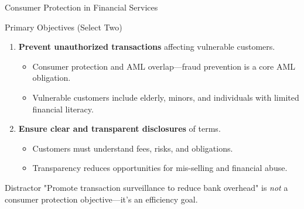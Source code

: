 \documentclass{beamer}
\begin{document}
	\begin{frame}{Consumer Protection in Financial Services}
		\begin{block}{Primary Objectives (Select Two)}
			\begin{enumerate}
				\item \textbf{Prevent unauthorized transactions} affecting vulnerable customers.
				\begin{itemize}
					\item Consumer protection and AML overlap—fraud prevention is a core AML obligation.
					\item Vulnerable customers include elderly, minors, and individuals with limited financial literacy.
				\end{itemize}
				\item \textbf{Ensure clear and transparent disclosures} of terms.
				\begin{itemize}
					\item Customers must understand fees, risks, and obligations.
					\item Transparency reduces opportunities for mis-selling and financial abuse.
				\end{itemize}
			\end{enumerate}
		\end{block}
		\begin{alertblock}{Distractor}
			"Promote transaction surveillance to reduce bank overhead" is \textit{not} a consumer protection objective—it's an efficiency goal.
		\end{alertblock}
	\end{frame}
	
\end{document}
